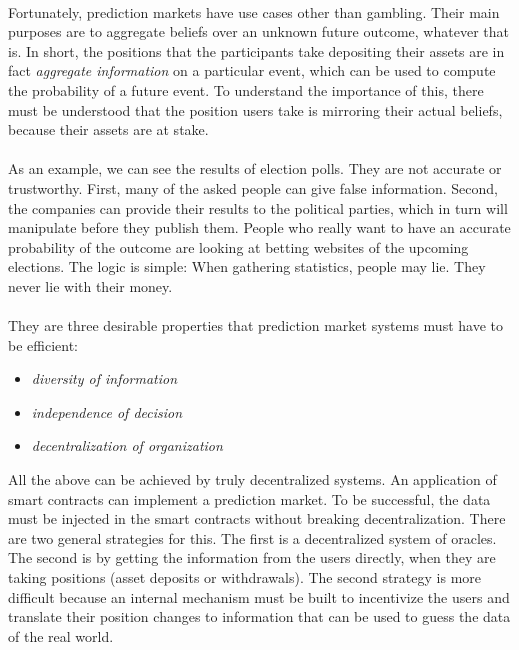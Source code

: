 \documentclass{article}
\begin{document}
\paragraph{}
Fortunately, prediction markets have use cases other than gambling. Their main purposes are to aggregate beliefs over an unknown future outcome, whatever that is. In short, the positions that the participants take depositing their assets are in fact \emph{aggregate information} on a particular event, which can be used to compute the probability of a future event. To understand the importance of this, there must be understood that the position users take is mirroring their actual beliefs, because their assets are at stake.
\paragraph{}
As an example, we can see the results of election polls. They are not accurate or trustworthy. First, many of the asked people can give false information. Second, the companies can provide their results to the political parties, which in turn will manipulate before they publish them. People who really want to have an accurate probability of the outcome are looking at betting websites of the upcoming elections. The logic is simple:
When gathering statistics, people may lie. They never lie with their money.
\paragraph{}
They are three desirable properties that prediction market systems must have to be efficient:
\begin{itemize}
\item \emph{diversity of information}
\item \emph{independence of decision}
\item \emph{decentralization of organization}
\end{itemize}
All the above can be achieved by truly decentralized systems. An application of smart contracts can implement a prediction market. To be successful, the data must be injected in the smart contracts without breaking decentralization. There are two general strategies for this. The first is a decentralized system of oracles. The second is by getting the information from the users directly, when they are taking positions (asset deposits or withdrawals). The second strategy is more difficult because an internal mechanism must be built to incentivize the users and translate their position changes to information that can be used to guess the data of the real world.
\end{document}
